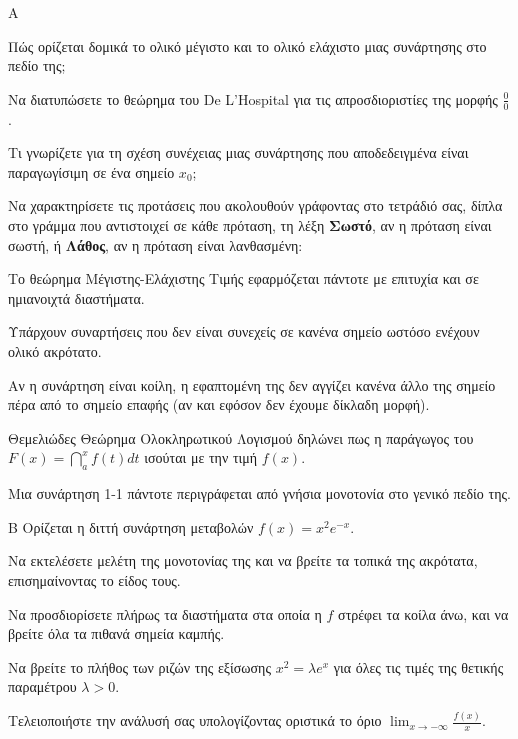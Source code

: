 \begin{thema}{Α}
\begin{erwthma}
    \item Πώς ορίζεται δομικά το ολικό μέγιστο και το ολικό ελάχιστο μιας συνάρτησης στο πεδίο της; 
    \item Να διατυπώσετε το θεώρημα του De L'Hospital για τις απροσδιοριστίες της μορφής $\frac{0}{0}$. 
    \item Τι γνωρίζετε για τη σχέση συνέχειας μιας συνάρτησης που αποδεδειγμένα είναι παραγωγίσιμη σε ένα σημείο $x_0$; 
    \item Να χαρακτηρίσετε τις προτάσεις που ακολουθούν γράφοντας στο τετράδιό σας, δίπλα στο γράμμα που αντιστοιχεί σε κάθε πρόταση, τη λέξη \textbf{Σωστό},
αν η πρόταση είναι σωστή, ή \textbf{Λάθος}, αν η πρόταση είναι λανθασμένη:
    \begin{alist}
        \item Το θεώρημα Μέγιστης-Ελάχιστης Τιμής εφαρμόζεται πάντοτε με επιτυχία και σε ημιανοιχτά διαστήματα.
        \item Υπάρχουν συναρτήσεις που δεν είναι συνεχείς σε κανένα σημείο ωστόσο ενέχουν ολικό ακρότατο.
        \item Αν η συνάρτηση είναι κοίλη, η εφαπτομένη της δεν αγγίζει κανένα άλλο της σημείο πέρα από το σημείο επαφής (αν και εφόσον δεν έχουμε δίκλαδη μορφή).
        \item Θεμελιώδες Θεώρημα Ολοκληρωτικού Λογισμού δηλώνει πως η παράγωγος του $F(x) = \dint_a^x f(t) dt$ ισούται με την τιμή $f(x)$.
        \item Μια συνάρτηση 1-1 πάντοτε περιγράφεται από γνήσια μονοτονία στο γενικό πεδίο της.
    \end{alist} 
\end{erwthma}
\end{thema}

\begin{thema}{Β}
Ορίζεται η διττή συνάρτηση μεταβολών $f(x) = x^2 e^{-x}$.
\begin{erwthma}
    \item Να εκτελέσετε μελέτη της μονοτονίας της και να βρείτε τα τοπικά της ακρότατα, επισημαίνοντας το είδος τους. 
    \item Να προσδιορίσετε πλήρως τα διαστήματα στα οποία η $f$ στρέφει τα κοίλα άνω, και να βρείτε όλα τα πιθανά σημεία καμπής. 
    \item Να βρείτε το πλήθος των ριζών της εξίσωσης $x^2 = \lambda e^x$ για όλες τις τιμές της θετικής παραμέτρου $\lambda > 0$. 
    \item Τελειοποιήστε την ανάλυσή σας υπολογίζοντας οριστικά το όριο $\displaystyle\lim_{x\to-\infty} \frac{f(x)}{x}$. 
\end{erwthma}
\end{thema}

